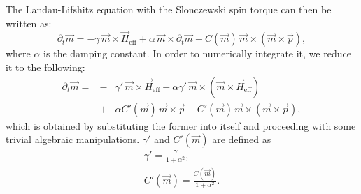 \documentclass[11pt]{article}
\newcommand{\vv}[1]{\vec{#1}}
\newcommand{\vvm}{\vv{m}}
\newcommand{\vvH}{\vv{H}_{\mathrm{eff}}}
\newcommand{\vvfix}{\vv{p}}
\newcommand{\derivp}[2]{\partial_{#2} #1}
\begin{document}
The Landau-Lifshitz equation with the Slonczewski spin torque can then be written as:
$$
\derivp{\vvm}{t} = 
  -\gamma \, \vvm \times \vvH
  + \alpha \, \vvm \times \derivp{\vvm}{t}
  + C(\vvm) \, \vvm \times (\vvm \times \vvfix),
$$
where $\alpha$ is the damping constant.
In order to numerically integrate it, we reduce it to the following:
\begin{eqnarray*}
	\derivp{\vvm}{t} = 
	&-& \gamma' \, \vvm \times \vvH
	- \alpha \gamma' \, \vvm \times (\vvm \times \vvH) {} \\
	&+& \alpha C'(\vvm) \, \vvm \times \vvfix
	- C'(\vvm) \, \vvm \times (\vvm \times \vvfix),
\end{eqnarray*}
which is obtained by substituting the former into itself and proceeding
with some trivial algebraic manipulations.
$\gamma'$ and $C'(\vvm)$ are defined as
\begin{eqnarray}
\gamma' = \frac{\gamma}{1 + \alpha^2}, \nonumber \\
C'(\vvm) = \frac{C(\vvm)}{1 + \alpha^2}. \nonumber
\end{eqnarray}
\end{document}
